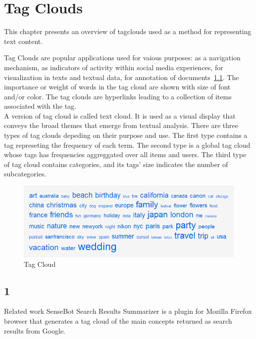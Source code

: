 \chapter{Tag Clouds}
\label{sec:semannot}

\begin{summary}
This chapter presents an overview of tagclouds used as a method for representing text content.
\end{summary}

Tag Clouds are popular applications used for vaious purposes: as a navigation mechanism, as indicators of activity within social media experiences, for visualization in texts and textual data, for annotation of documents~\ref{fig:tagcloud}. The importance or weight of words in the tag cloud are shown with size of font and/or color. The tag clouds are hyperlinks leading to a collection of items associated with the tag.\\
A version of tag cloud is called text cloud. It is used as a visual display that conveys the broad themes that emerge from textual analysis.  
There are three types of tag clouds depeding on their purpose and use. The first type contains a tag represeting the frequency of each term. The second type is a global tag cloud whose tags has frequencies aggreggated over all items and users. The third type of tag cloud contains categories, and its tags' size indicates the number of subcategories.\\
%
%
\begin{figure}[htbp]
	\centering
	\includegraphics[width=\ScaleIfNeeded]{img/tagcloud} 
	\caption{Tag Cloud}
	\label{fig:tagcloud}
\end{figure}

\section{1}
\label{sec:semannot:1}
Related work 
SenseBot Search Results Summarizer is a plugin for Mozilla Firefox browser that generates a tag cloud of the main concepts returned as search results from Google.

